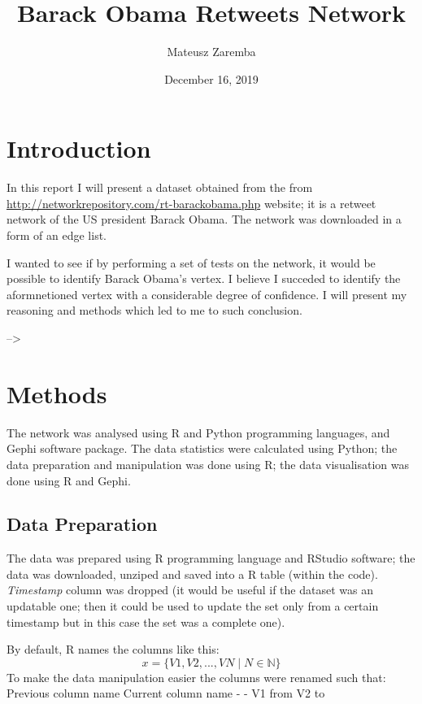 \documentclass[
]{article}
\title{Barack Obama Retweets Network}
\author{Mateusz Zaremba}
\date{December 16, 2019}
\begin{document}
\maketitle

\hypertarget{introduction}{%
\section{Introduction}\label{introduction}}

In this report I will present a dataset obtained from the from
\url{http://networkrepository.com/rt-barackobama.php} website; it is a
retweet network of the US president Barack Obama. The network was
downloaded in a form of an edge list.

I wanted to see if by performing a set of tests on the network, it would
be possible to identify Barack Obama's vertex. I believe I succeded to
identify the aformnetioned vertex with a considerable degree of
confidence. I will present my reasoning and methods which led to me to
such conclusion.

--\textgreater{}

\hypertarget{methods}{%
\section{Methods}\label{methods}}

The network was analysed using R and Python programming languages, and
Gephi software package. The data statistics were calculated using
Python; the data preparation and manipulation was done using R; the data
visualisation was done using R and Gephi.

\hypertarget{data-preparation}{%
\subsection{Data Preparation}\label{data-preparation}}

The data was prepared using R programming language and RStudio software;
the data was downloaded, unziped and saved into a R table (within the
code). \emph{Timestamp} column was dropped (it would be useful if the
dataset was an updatable one; then it could be used to update the set
only from a certain timestamp but in this case the set was a complete
one).

By default, R names the columns like this:
\[  x =  \big\{V1, V2, ... , VN \mid N \in \mathbb{N} \big\}  \] To make
the data manipulation easier the columns were renamed such that:
\textbar{} Previous column name \textbar{} Current column name
\textbar{} \textbar{} - \textbar{} - \textbar{} \textbar{} V1 \textbar{}
from \textbar{} \textbar{} V2 \textbar{} to \textbar{}
\end{document}
